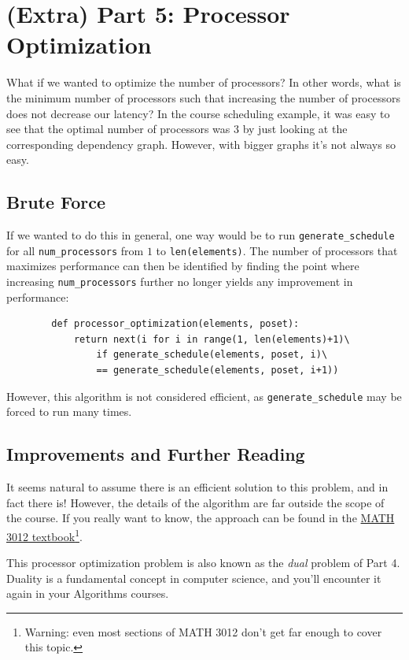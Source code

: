\documentclass{article}
\begin{document}
    \section*{(Extra) Part 5: Processor Optimization}
    What if we wanted to optimize the number of processors? In other words, what is the minimum number of processors such that increasing the number of processors does not decrease our latency? In the course scheduling example, it was easy to see that the optimal number of processors was $3$ by just looking at the corresponding dependency graph. However, with bigger graphs it's not always so easy.
    
    \subsection*{Brute Force}
    If we wanted to do this in general, one way would be to run \lstinline{generate_schedule} for all \lstinline{num_processors} from $1$ to \lstinline{len(elements)}. The number of processors that maximizes performance can then be identified by finding the point where increasing \lstinline{num_processors} further no longer yields any improvement in performance:
    
    \begin{lstlisting}
        def processor_optimization(elements, poset):
            return next(i for i in range(1, len(elements)+1)\
                if generate_schedule(elements, poset, i)\
                == generate_schedule(elements, poset, i+1))
    \end{lstlisting}
    However, this algorithm is not considered efficient, as \lstinline{generate_schedule} may be forced to run many times. 

    \subsection*{Improvements and Further Reading}
    It seems natural to assume there is an efficient solution to this problem, and in fact there is! However, the details of the algorithm are far outside the scope of the course. If you really want to know, the approach can be found in the \href{https://www.appliedcombinatorics.org/book/s_flowapplications_chain-partition.html}{MATH 3012 textbook}\footnote{Warning: even most sections of MATH 3012 don't get far enough to cover this topic.}.
    
    \vspace{3mm} This processor optimization problem is also known as the \textit{dual} problem of Part 4. Duality is a fundamental concept in computer science, and you'll encounter it again in your Algorithms courses.
\end{document}
